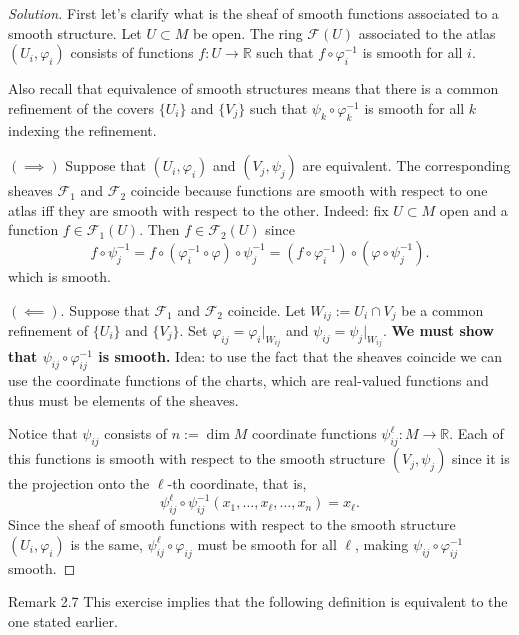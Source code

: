 \begin{proof}[Solution]\leavevmode
First let's clarify what is the sheaf of smooth functions associated to a smooth structure. Let $U \subset M$ be open.  The ring $\mathcal{F}(U)$ associated to the atlas $(U_i,\varphi_i)$ consists of functions $f:U \to \mathbb{R}$ such that $f \circ \varphi_i^{-1}$ is smooth for all $i$.

Also recall that equivalence of smooth structures means that there is a common refinement of the covers $\{U_i\}$ and $\{V_j\}$ such that $\psi_k\circ \varphi_k^{-1}$ is smooth for all $k$ indexing the refinement.

$(\implies )$ Suppose that $(U_i,\varphi_i)$ and $(V_j,\psi_j)$ are equivalent. The corresponding sheaves $\mathcal{F}_1$ and $\mathcal{F}_2$ coincide because functions are smooth with respect to one atlas iff they are smooth with respect to the other. Indeed: fix $U \subset M$ open and a function $f \in\mathcal{F}_1(U)$. Then $f \in \mathcal{F}_2(U)$ since
\[f \circ \psi^{-1}_j=f \circ (\varphi_i^{-1}\circ \varphi)\circ\psi_j^{-1}=(f \circ \varphi_i^{-1})\circ (\varphi\circ\psi_j^{-1}).\]
which is smooth.

$(\impliedby)$. Suppose that $\mathcal{F}_1$ and $\mathcal{F}_2$ coincide. Let $W_{ij}:=U_i \cap V_j$ be a common refinement of $\{U_i\}$ and $\{V_j\}$. Set $\varphi_{ij}=\varphi_i|_{W_{ij}}$ and $\psi_{ij}=\psi_j|_{W_{ij}}$. \textbf{We must show that $\psi_{ij}\circ \varphi_{ij}^{-1}$ is smooth.} Idea: to use the fact that the sheaves coincide we can use the coordinate functions of the charts, which are real-valued functions and thus must be elements of the sheaves.

Notice that $\psi_{ij}$ consists of $n:=\dim M$ coordinate functions  $\psi_{ij}^\ell:M \to \mathbb{R}$. Each of this functions is smooth with respect to the smooth structure $(V_j,\psi_j)$ since it is the projection onto the $\ell$-th coordinate, that is,
\[\psi_{ij}^\ell \circ \psi_{ij}^{-1}(x_1,\ldots,x_\ell,\ldots,x_n)=x_\ell.\]
Since the sheaf of smooth functions with respect to the smooth structure $(U_i,\varphi_i)$ is the same, $\psi_{ij}^\ell \circ \varphi_{ij}$ must be smooth for all $\ell$, making $\psi_{ij}\circ \varphi_{ij}^{-1}$ smooth.
\end{proof}

\begin{thing5}{Remark 2.7}\label{rk:2.7}\leavevmode
This exercise implies that the following definition is equivalent to the one stated earlier.
\end{thing5}

